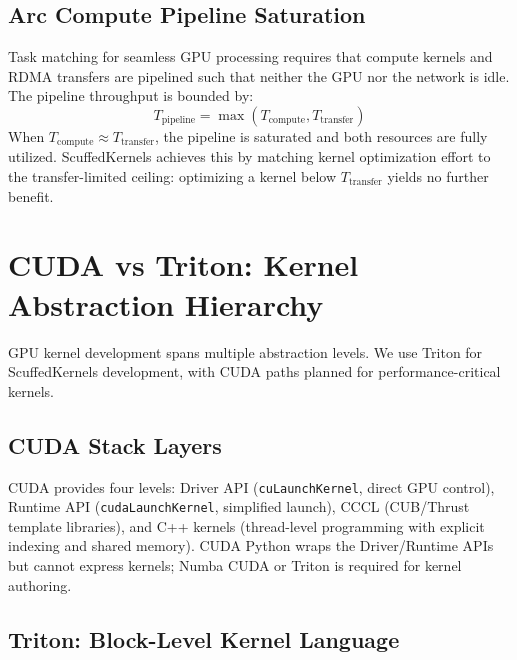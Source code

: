 \documentclass[11pt,letterpaper]{article}
\theoremstyle{definition}
\begin{document}
\subsection{Arc Compute Pipeline Saturation}

Task matching for seamless GPU processing requires that compute kernels and RDMA transfers are pipelined such that neither the GPU nor the network is idle. The pipeline throughput is bounded by:
\begin{equation}
    T_{\text{pipeline}} = \max(T_{\text{compute}}, T_{\text{transfer}})
\end{equation}
When $T_{\text{compute}} \approx T_{\text{transfer}}$, the pipeline is saturated and both resources are fully utilized. ScuffedKernels achieves this by matching kernel optimization effort to the transfer-limited ceiling: optimizing a kernel below $T_{\text{transfer}}$ yields no further benefit.

\section{CUDA vs Triton: Kernel Abstraction Hierarchy}
\label{sec:cuda-triton}

GPU kernel development spans multiple abstraction levels. We use Triton for ScuffedKernels development, with CUDA paths planned for performance-critical kernels.

\subsection{CUDA Stack Layers}

CUDA provides four levels: Driver API (\texttt{cuLaunchKernel}, direct GPU control), Runtime API (\texttt{cudaLaunchKernel}, simplified launch), CCCL (CUB/Thrust template libraries), and C++ kernels (thread-level programming with explicit indexing and shared memory). CUDA Python wraps the Driver/Runtime APIs but cannot express kernels; Numba CUDA or Triton is required for kernel authoring.

\subsection{Triton: Block-Level Kernel Language}
\end{document}
